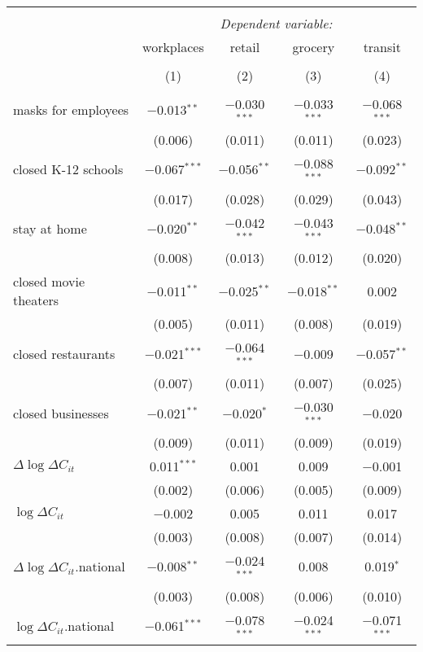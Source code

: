 \begin{tabular}{@{\extracolsep{1pt}}lcccc} 
\\[-1.8ex]\hline 
\hline \\[-1.8ex] 
 & \multicolumn{4}{c}{\textit{Dependent variable:}} \\ 
\cline{2-5} 
 & workplaces & retail & grocery & transit \\ 
\\[-1.8ex] & (1) & (2) & (3) & (4)\\ 
\hline \\[-1.8ex] 
 masks for employees & $-$0.013$^{**}$ & $-$0.030$^{***}$ & $-$0.033$^{***}$ & $-$0.068$^{***}$ \\ 
  & (0.006) & (0.011) & (0.011) & (0.023) \\ 
  closed K-12 schools & $-$0.067$^{***}$ & $-$0.056$^{**}$ & $-$0.088$^{***}$ & $-$0.092$^{**}$ \\ 
  & (0.017) & (0.028) & (0.029) & (0.043) \\ 
  stay at home & $-$0.020$^{**}$ & $-$0.042$^{***}$ & $-$0.043$^{***}$ & $-$0.048$^{**}$ \\ 
  & (0.008) & (0.013) & (0.012) & (0.020) \\ 
  closed movie theaters & $-$0.011$^{**}$ & $-$0.025$^{**}$ & $-$0.018$^{**}$ & 0.002 \\ 
  & (0.005) & (0.011) & (0.008) & (0.019) \\ 
  closed restaurants & $-$0.021$^{***}$ & $-$0.064$^{***}$ & $-$0.009 & $-$0.057$^{**}$ \\ 
  & (0.007) & (0.011) & (0.007) & (0.025) \\ 
  closed businesses & $-$0.021$^{**}$ & $-$0.020$^{*}$ & $-$0.030$^{***}$ & $-$0.020 \\ 
  & (0.009) & (0.011) & (0.009) & (0.019) \\ 
  $\Delta \log \Delta C_{it}$ & 0.011$^{***}$ & 0.001 & 0.009 & $-$0.001 \\ 
  & (0.002) & (0.006) & (0.005) & (0.009) \\ 
  $\log \Delta C_{it}$ & $-$0.002 & 0.005 & 0.011 & 0.017 \\ 
  & (0.003) & (0.008) & (0.007) & (0.014) \\ 
  $\Delta \log \Delta C_{it}$.national & $-$0.008$^{**}$ & $-$0.024$^{***}$ & 0.008 & 0.019$^{*}$ \\ 
  & (0.003) & (0.008) & (0.006) & (0.010) \\ 
  $\log \Delta C_{it}$.national & $-$0.061$^{***}$ & $-$0.078$^{***}$ & $-$0.024$^{***}$ & $-$0.071$^{***}$ \\ 

\end{tabular}
